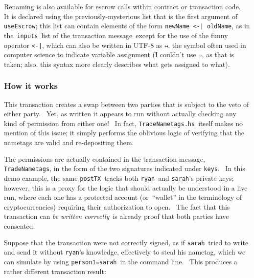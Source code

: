 \documentclass[11pt]{article}
\begin{document}

\vspace{11pt}

Renaming is also available for escrow calls within contract or transaction code.  It is declared using the previously-mysterious list that is the first argument of \texttt{useEscrow}; this list can contain elements of the form \texttt{newName }\texttt{\textless{}}\texttt{-| oldName}, as in the \texttt{inputs} list of the transaction message except for the use of the funny operator \texttt{\textless{}}\texttt{-|}, which can also be written in UTF-8 as \texttt{{\fbf ↤}}, the symbol often used in computer science to indicate variable assignment (I couldn't use \texttt{=}, as that is taken; also, this syntax more clearly describes what gets assigned to what).

\subsubsection{How it works}
\vspace{5.5pt}

This transaction creates a swap between two parties that is subject to the veto of either party.  Yet, as written it appears to run without actually checking any kind of permission from either one!  In fact, \texttt{TradeNametags.hs} itself makes no mention of this issue; it simply performs the oblivious logic of verifying that the nametags are valid and re-depositing them.  


\vspace{11pt}

The permissions are actually contained in the transaction message, \texttt{TradeNametags}, in the form of the two signatures indicated under \texttt{keys}.  In this demo example, the same \texttt{postTX} tracks both \texttt{ryan} and \texttt{sarah}'s private keys; however, this is a proxy for the logic that should actually be understood in a live run, where each one has a protected account (or “wallet” in the terminology of cryptocurrencies) requiring their authorization to open.  The fact that this transaction can \textit{be written correctly} is already proof that both parties have consented.


\vspace{11pt}

Suppose that the transaction were not correctly signed, as if \texttt{sarah} tried to write and send it without \texttt{ryan}'s knowledge, effectively to steal his nametag, which we can simulate by using \texttt{person1=sarah} in the command line.  This produces a rather different transaction result:
\end{document}

